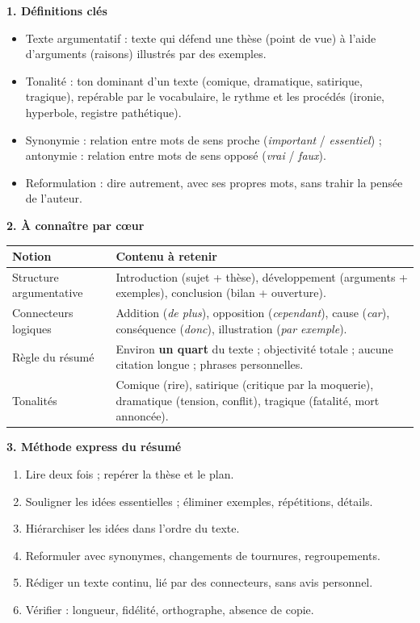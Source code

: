 \documentclass[11pt]{article}
\newcommand{\cle}[1]{{\popxbold\color{popdark}#1}}
\begin{document}
\begin{bilan}
\textbf{1. Définitions clés}
\begin{itemize}
  \item \cle{Texte argumentatif} : texte qui défend une \cle{thèse} (point de vue) à l'aide d'\cle{arguments} (raisons) illustrés par des \cle{exemples}.
  \item \cle{Tonalité} : ton dominant d'un texte (comique, dramatique, satirique, tragique), repérable par le vocabulaire, le rythme et les procédés (ironie, hyperbole, registre pathétique).
  \item \cle{Synonymie} : relation entre mots de sens proche (\emph{important} / \emph{essentiel}) ; \cle{antonymie} : relation entre mots de sens opposé (\emph{vrai} / \emph{faux}).
  \item \cle{Reformulation} : dire autrement, avec ses propres mots, sans trahir la pensée de l'auteur.
\end{itemize}

\textbf{2. À connaître par cœur}
\begin{center}
\begin{tabularx}{\linewidth}{|l|X|}\hline
\rowcolor{popblueL} \textbf{Notion} & \textbf{Contenu à retenir} \\ \hline
Structure argumentative & Introduction (sujet + thèse), développement (arguments + exemples), conclusion (bilan + ouverture). \\ \hline
Connecteurs logiques & Addition (\emph{de plus}), opposition (\emph{cependant}), cause (\emph{car}), conséquence (\emph{donc}), illustration (\emph{par exemple}). \\ \hline
Règle du résumé & Environ \textbf{un quart} du texte ; objectivité totale ; aucune citation longue ; phrases personnelles. \\ \hline
Tonalités & Comique (rire), satirique (critique par la moquerie), dramatique (tension, conflit), tragique (fatalité, mort annoncée). \\ \hline
\end{tabularx}
\end{center}

\textbf{3. Méthode express du résumé}
\begin{enumerate}
  \item Lire deux fois ; repérer la thèse et le plan.
  \item Souligner les idées essentielles ; éliminer exemples, répétitions, détails.
  \item Hiérarchiser les idées dans l'ordre du texte.
  \item Reformuler avec synonymes, changements de tournures, regroupements.
  \item Rédiger un texte continu, lié par des connecteurs, sans avis personnel.
  \item Vérifier : longueur, fidélité, orthographe, absence de copie.
\end{enumerate}
\end{bilan}
\end{document}
